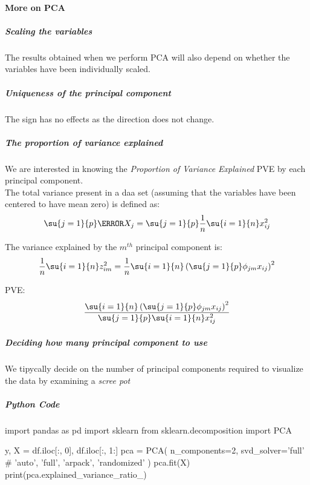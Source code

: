 \paragraph{More on PCA}
\subparagraph{Scaling the variables}
The results obtained when we perform PCA will also depend on whether
the variables have been individually scaled.
\subparagraph{Uniqueness of the principal component}
The sign has no effects as the direction does not change.
\subparagraph{The proportion of variance explained}
We are interested in knowing the \emph{Proportion of Variance
Explained} PVE by each principal component. \\
The total variance present in a daa set (assuming that the variables
have been centered to have mean zero) is defined as:
$$
\su{{j=1}}{p}\V{X_{j}}=\su{{j=1}}{p}\dfrac{1}{n}\su{{i=1}}{n}x_{ij}^{2}
$$

The variance explained by the $m^{th}$ principal component is:
$$
\dfrac{1}{n}\su{{i=1}}{n}z_{im}^{2}=\dfrac{1}{n}\su{{i=1}}{n}\left( \su{{j=1}}{p}\phi_{jm}x_{ij} \right)^{2}
$$

PVE:
$$
\dfrac{\su{{i=1}}{n}\left( \su{{j=1}}{p}\phi_{jm}x_{ij} \right)^{2}}{\su{{j=1}}{p}\su{{i=1}}{n}x_{ij}^{2}}
$$

\subparagraph{Deciding how many principal component to use}
We tipycally decide on the number of principal components required
to visualize the data by examining a \emph{scree pot}


\subparagraph{Python Code}
\begin{python}
import pandas as pd
import sklearn
from sklearn.decomposition import PCA

y, X = df.iloc[:, 0], df.iloc[:, 1:]
pca = PCA(
   n_components=2,
   svd_solver='full' # {'auto', 'full', 'arpack', 'randomized'}
   )
pca.fit(X)
print(pca.explained_variance_ratio_)
\end{python}
